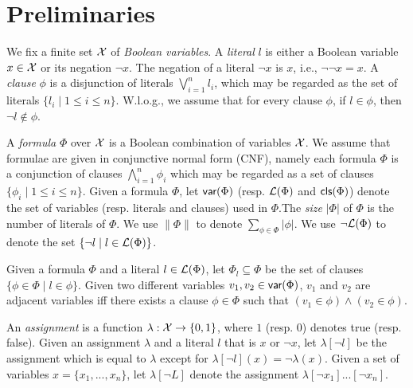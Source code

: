 \section{Preliminaries}\label{sec:prel}

We fix a finite set  $\mathcal{X}$ of \emph{Boolean variables}.
A \emph{literal} $l$ is either a Boolean variable $x\in \mathcal{X}$ or its negation $\neg x$.
The negation of a literal $\neg x$ is $x$, i.e., $\neg\neg x=x$.
A \emph{clause} $\phi$ is a disjunction of literals $\bigvee_{i=1}^n l_i$, which may be regarded as
the set of literals $\{l_i\mid 1\leq i\leq n\}$. W.l.o.g., we assume that for every
clause $\phi$, if $l\in\phi$, then $\neg l\not\in \phi$.

A \emph{formula} $\Phi$ over $\mathcal{X}$ is a Boolean combination of variables $\mathcal{X}$.
We assume that formulae are given in conjunctive normal
form (CNF), namely each formula $\Phi$ is a conjunction of clauses $\bigwedge_{i=1}^n\phi_i$ which may be regarded as a set of clauses $\{\phi_i\mid 1\leq i\leq n\}$. Given a formula $\Phi$, let $\textsf{var}(\Phi)$ (resp. $\Lit(\Phi)$  and $\textsf{cls}(\Phi)$) denote the set of variables (resp. literals and clauses) used in $\Phi$.The \emph{size} $|\Phi|$ of $\Phi$ is the number of literals of $\Phi$.
We use $\|\Phi\|$ to denote $\sum_{\phi\in\Phi}|\phi|$.
We use $\neg\Lit(\Phi)$ to denote the set $\{\neg l \mid l\in \Lit(\Phi)\}$.

Given a formula $\Phi$ and a literal $l\in\Lit(\Phi)$,
let $\Phi_{l}\subseteq \Phi$ be the set of clauses $\{\phi\in\Phi\mid l\in\phi\}$.
Given two different variables $v_1, v_2\in\textsf{var}(\Phi)$, $v_1$ and $v_2$ are adjacent variables iff there exists a clause $\phi\in\Phi$ such that $(v_1\in\phi)\wedge(v_2\in\phi)$.


An \emph{assignment} is a function $\lambda: \mathcal{X} \rightarrow \{0,1\}$, where $1$ (resp. $0$) denotes true (resp. false).
Given an assignment $\lambda$ and a literal $l$ that is $x$ or $\neg x$, let $\lambda[\neg l]$ be the assignment which is equal to $\lambda$
except for $\lambda[\neg l](x)=\neg \lambda(x)$. Given a set of variables $x=\{x_1,...,x_n\}$, let $\lambda[\neg L]$ denote the assignment
$\lambda[\neg x_1]...[\neg x_n]$. 



